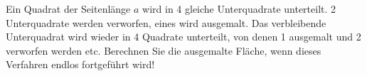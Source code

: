 \item Ein Quadrat der Seitenlänge $a$ wird in 4 gleiche Unterquadrate unterteilt. 2 Unterquadrate werden verworfen, eines wird ausgemalt. Das verbleibende Unterquadrat wird wieder in 4 Quadrate unterteilt, von denen 1 ausgemalt und 2 verworfen werden etc. Berechnen Sie die ausgemalte Fläche, wenn dieses Verfahren endlos fortgeführt wird!
